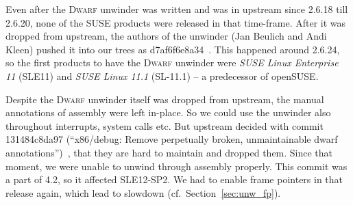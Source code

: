 \documentclass[10pt]{llncs}
\newcommand{\commit}[1][]{\texttt{#1}}
\newcommand{\dwarf}{\textsc{Dwarf}\xspace}
\begin{document}
Even after the \dwarf unwinder was written and was in upstream since 2.6.18
till 2.6.20, none of the SUSE products were released in that time-frame. After
it was dropped from upstream, the authors of the unwinder (Jan Beulich and
Andi Kleen) pushed it into our trees as
\commit{d7af6f6e8a34}~\cite{git_suse_dwarf_add}.  This happened around 2.6.24,
so the first products to have the \dwarf unwinder were \textit{SUSE Linux
Enterprise 11} (SLE11) and \textit{SUSE Linux 11.1} (SL-11.1) -- a predecessor
of openSUSE.

Despite the \dwarf unwinder itself was dropped from upstream, the manual
annotations of assembly were left in-place. So we could use the unwinder
also throughout interrupts, system calls etc. But upstream decided with commit
\commit{131484c8da97} (``x86/debug: Remove perpetually broken, unmaintainable
dwarf annotations'')~\cite{git_dwarfinfo_upstream_rm}, that they are
hard to maintain and dropped them. Since that moment, we were unable to unwind
through assembly properly. This commit was a part of 4.2, so it affected
SLE12-SP2. We had to enable frame pointers in that release again, which lead
to slowdown (cf.\ Section~\ref{sec:unw_fp}).
\end{document}
